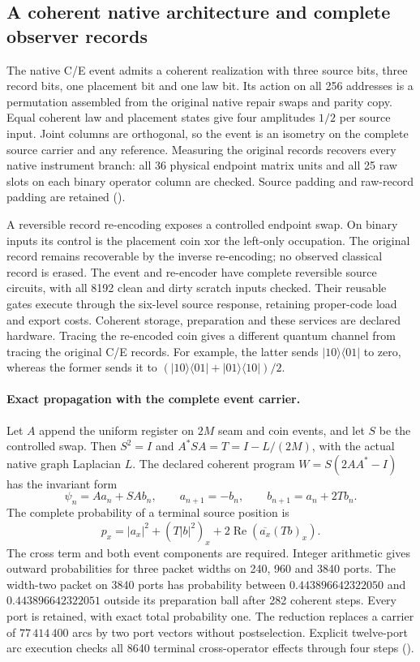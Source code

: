 \subsection{A coherent native architecture and complete observer records}

The native C/E event admits a coherent realization with three source bits,
three record bits, one placement bit and one law bit.  Its action on all
256 addresses is a permutation assembled from the original native repair
swaps and parity copy.  Equal coherent law and placement states give four
amplitudes $1/2$ per source input.  Joint columns are orthogonal, so the
event is an isometry on the complete source carrier and any reference.
Measuring the original records recovers every native instrument branch:
all 36 physical endpoint matrix units and all 25 raw slots on each binary
operator column are checked.  Source padding and raw-record padding are
retained ().

A reversible record re-encoding exposes a controlled endpoint swap.  On
binary inputs its control is the placement coin xor the left-only
occupation.  The original record remains recoverable by the inverse
re-encoding; no observed classical record is erased.  The event and
re-encoder have complete reversible source circuits, with all 8192 clean
and dirty scratch inputs checked.  Their reusable gates execute through
the six-level source response, retaining proper-code load and export
costs.  Coherent storage, preparation and these services are declared
hardware.  Tracing the re-encoded coin gives a different quantum channel
from tracing the original C/E records.  For example, the latter sends
$|10\rangle\langle01|$ to zero, whereas the former sends it to
$(|10\rangle\langle01|+|01\rangle\langle10|)/2$.

\paragraph{Exact propagation with the complete event carrier.}
Let $A$ append the uniform register on $2M$ seam and coin events, and let
$S$ be the controlled swap.  Then $S^2=I$ and
$A^*SA=T=I-L/(2M)$, with the actual native graph Laplacian $L$.
The declared coherent program $W=S(2AA^*-I)$ has the invariant form
\[
 \psi_n=Aa_n+SAb_n,\qquad
 a_{n+1}=-b_n,\qquad b_{n+1}=a_n+2Tb_n.
\]
The complete probability of a terminal source position is
\[
 p_x=|a_x|^2+(T|b|^2)_x
       +2\operatorname{Re}\!\left(\overline{a_x}(Tb)_x\right).
\]
The cross term and both event components are required.  Integer arithmetic
gives outward probabilities for three packet widths on 240, 960 and 3840
ports.  The width-two packet on 3840 ports has probability between
$0.443896642322050$ and $0.443896642322051$ outside its preparation ball
after 282 coherent steps.  Every port is retained, with exact total
probability one.  The reduction replaces a carrier of $77\,414\,400$ arcs
by two port vectors without postselection.  Explicit twelve-port arc
execution checks all 8640 terminal cross-operator effects through four
steps ().

